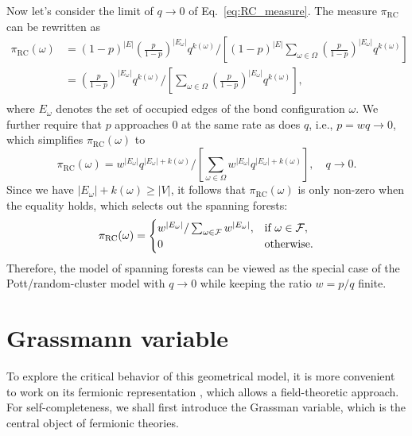 Now let's consider the limit of $q\to 0$ of Eq.~\eqref{eq:RC_measure}. The measure $\pi_{\text{RC}}$ can be rewritten as
\begin{equation}
	\begin{aligned}
	\pi_{\text{RC}}(\omega) &= (1-p)^{|E|}(\frac{p}{1-p})^{|E_\omega|}q^{k(\omega)}\Bigg/\left[(1-p)^{|E|}\sum_{\omega \in \Omega}(\frac{p}{1-p})^{|E_\omega|}q^{k(\omega)}\right]\\
	&= (\frac{p}{1-p})^{|E_\omega|}q^{k(\omega)}\Bigg/\left[\sum_{\omega \in \Omega}(\frac{p}{1-p})^{|E_\omega|}q^{k(\omega)}\right],\\
	\end{aligned}
\end{equation}
where $E_\omega$ denotes the set of occupied edges of the bond configuration $\omega$. We further require that $p$ approaches 0 at the same rate as does $q$, i.e., $p = w q \to 0$, which simplifies $\pi_{\text{RC}}(\omega)$ to
\begin{equation}
	\pi_{\text{RC}}(\omega) = w^{|E_\omega|}q^{|E_\omega| + k(\omega)}\Bigg/\left[\sum_{\omega \in \Omega}w^{|E_\omega|}q^{|E_\omega| + k(\omega)}\right], \quad q \to 0.
\end{equation}
Since we have $|E_\omega| + k(\omega) \geq |V|$, it follows that $\pi_{\text{RC}}(\omega)$ is only non-zero
when the equality holds, which selects out the spanning forests:
\begin{equation}
	\pi_{\text{RC}}(\omega) =
	\begin{cases}
	 w^{|E_\omega|}/\sum_{\omega \in {\mathcal F}}w^{|E_\omega|}, &\text{if}\ \omega \in {\mathcal F}, \\
	 0 &\text{otherwise}.
	\end{cases}
\end{equation}
Therefore, the model of spanning forests can be viewed as the special case of the Pott/random-cluster model with 
$q \to 0$ while keeping the ratio $w = p/q$ finite. 

\section{Grassmann variable}
To explore the critical behavior of this geometrical model, it is more convenient to work on its fermionic representation \cite{Caracciolo2004}, 
which allows a field-theoretic approach. For self-completeness, we shall first introduce the Grassman variable, which is the central object
of fermionic theories. 

